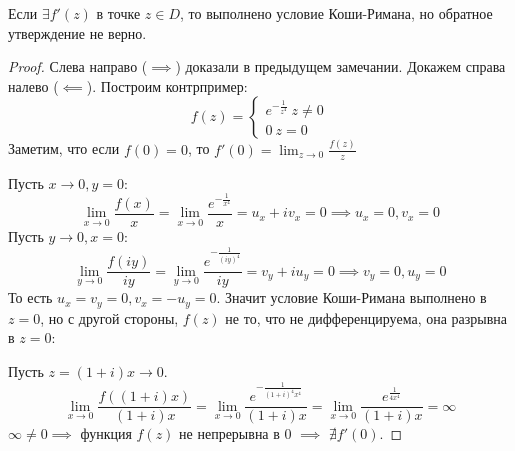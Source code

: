 \begin{statement}
    Если $\exists f'(z)$ в точке $z \in D$, то выполнено условие Коши-Римана, но обратное утверждение не верно.
    \begin{proof}
        Слева направо ($\implies$) доказали в предыдущем замечании.
        Докажем справа налево ($\impliedby$).
        Построим контрпример:
        \[f(z) = \begin{cases*}
            e^{-\frac{1}{z^4}} \ z \neq 0 \\
            0 \ z = 0
        \end{cases*}\]
        Заметим, что если $f(0) = 0$, то $f'(0) = \lim_{z \to 0}\frac{f(z)}{z}$
        
        Пусть $x \to 0, y = 0$:
        \[\lim_{x \to 0}\frac{f(x)}{x} = \lim_{x \to 0}\frac{e^{-\frac{1}{x^4}}}{x} = u_x + iv_x = 0 \implies u_x = 0, v_x = 0\]
        Пусть $y \to 0, x = 0$:
        \[\lim_{y \to 0}\frac{f(iy)}{iy} = \lim_{y \to 0}\frac{e^{-\frac{1}{(iy)^4}}}{iy} = v_y + iu_y = 0 \implies v_y = 0, u_y = 0\]
        То есть $u_x = v_y = 0, v_x = -u_y = 0$. Значит условие Коши-Римана выполнено в $z = 0$,
        но с другой стороны, $f(z)$ не то, что не дифференцируема, она разрывна в $z = 0$:
        \par
        Пусть $z = (1+ i)x \to 0$.
        \[\lim_{x \to 0}\frac{f((1+i)x)}{(1+i)x} = \lim_{x \to 0}\frac{e^{-\frac{1}{(1+i)^4 x^4}}}{(1+i)x} = \lim_{x \to 0}\frac{e^{\frac{1}{4x^4}}}{(1+i)x} = \infty\]
        $\infty \neq 0 \implies$ функция $f(z)$ не непрерывна в 0 $\implies$ $\nexists f'(0)$.

        
    \end{proof}
\end{statement}


